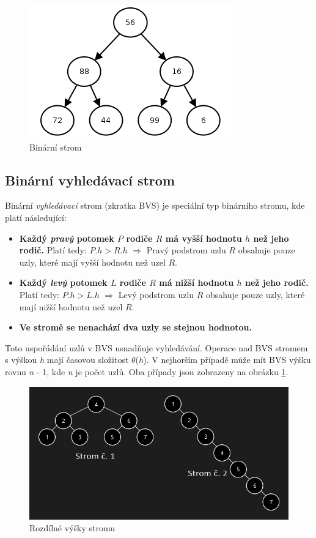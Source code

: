 \documentclass[
  biblatex=false,
  font=serif,
  glossaries=false,
  tables=false,
  theorems=false,
  index
]{kidiplom}
\begin{document}
\begin{figure}[h!]
\centering
	\includegraphics[scale=0.9]{obrazky/3BinarniStrom.png}
	\caption{Binární strom}
\end{figure}


\medskip
\subsection{Binární vyhledávací strom}
\indent\indent Binární \textit{vyhledávací} strom (zkratka BVS) je speciální typ binárního stromu, kde platí následující:
\begin{itemize}
\item \textbf {Každý \textit{pravý} potomek $P$ rodiče $R$ má vyšší hodnotu $h$ než jeho rodič.} Platí tedy: $P.h > R.h$ $\Rightarrow$ Pravý podstrom uzlu $R$ obsahuje pouze uzly, které mají vyšší hodnotu než uzel $R$. 
\item \textbf {Každý \textit{levý} potomek $L$ rodiče $R$ má nižší hodnotu $h$ než jeho rodič.} Platí tedy: $P.h > L.h$ $\Rightarrow$ Levý podstrom uzlu $R$ obsahuje pouze uzly, které mají nižší hodnotu než uzel $R$. 
\item \textbf {Ve stromě se nenachází dva uzly se stejnou hodnotou.}
\end{itemize} 

\noindent Toto uspořádání uzlů v BVS usnadňuje vyhledávání. Operace nad BVS stromem s výškou \textit{h}  mají časovou složitost $ \theta$(\textit{h}). V nejhorším případě může mít BVS výšku rovnu \textit{n} - 1, kde \textit{n} je počet uzlů. Oba případy jsou zobrazeny na obrázku \ref{binary}.

\begin{figure}[h!]
\centering
	\includegraphics[scale=0.7]{obrazky/4BinarniVyhledavaciStrom.png}
	\caption{Rozdílné výšky stromu}
	\label{binary}
\end{figure}
\end{document}
